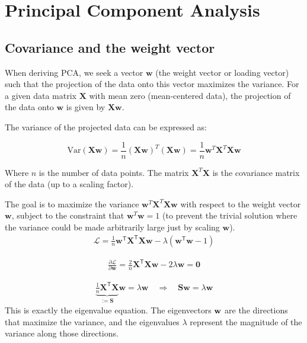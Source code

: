 \section{Principal Component Analysis}
\subsection{Covariance and the weight vector}

When deriving PCA, we seek a vector \( \mathbf{w} \) (the weight vector or loading vector) such that the projection of the data onto this vector maximizes the variance. For a given data matrix \( \mathbf{X} \) with mean zero (mean-centered data), the projection of the data onto \( \mathbf{w} \) is given by \( \mathbf{X}\mathbf{w} \).

The variance of the projected data can be expressed as:

\[
\text{Var}(\mathbf{X}\mathbf{w}) = \frac{1}{n} (\mathbf{X}\mathbf{w})^T (\mathbf{X}\mathbf{w}) = \frac{1}{n} \mathbf{w}^T \mathbf{X}^T \mathbf{X} \mathbf{w}
\]

Where \( n \) is the number of data points. The matrix \( \mathbf{X}^T \mathbf{X} \) is the covariance matrix of the data (up to a scaling factor).

The goal is to maximize the variance \( \mathbf{w}^T \mathbf{X}^T \mathbf{X} \mathbf{w} \) with respect to the weight vector \( \mathbf{w} \), subject to the constraint that \( \mathbf{w}^T \mathbf{w} = 1 \) (to prevent the trivial solution where the variance could be made arbitrarily large just by scaling \( \mathbf{w} \)).
\begin{align*}
	\mathcal{L} = \frac{1}{n} \mathbf{w}^\mathsf{T} \mathbf{X}^\mathsf{T} \mathbf{X} \mathbf{w} - \lambda \left( \mathbf{w}^\mathsf{T} \mathbf{w}  - 1 \right)
\end{align*}

\begin{align*}
	\frac{\partial \mathcal{L}}{\partial \mathbf{w}} = \frac{2}{n} \mathbf{X}^\mathsf{T} \mathbf{X} \mathbf{w} - 2 \lambda \mathbf{w} = \mathbf{0}
\end{align*}

\begin{align*}
	\underbrace{ \frac{1}{n} \mathbf{X}^\mathsf{T} \mathbf{X} }_{:= \mathbf{S} } \mathbf{w} = \lambda \mathbf{w}  \quad \Rightarrow \quad \mathbf{S} \mathbf{w} = \lambda \mathbf{w}
\end{align*}
This is exactly the eigenvalue equation. The eigenvectors ${\mathbf{w}}$ are the directions that maximize the variance, and the eigenvalues $\lambda$ represent the magnitude of the variance along those directions.

